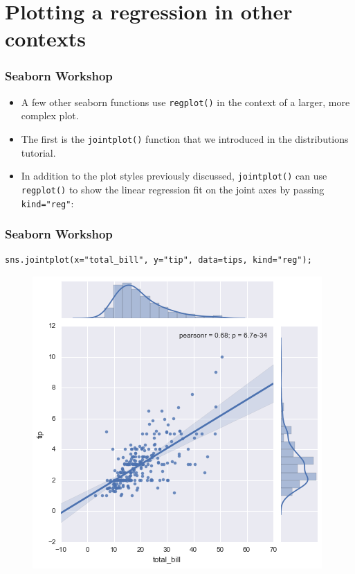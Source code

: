 \documentclass{beamer}
\begin{document}
\section{Plotting a regression in other contexts}
\begin{frame}[fragile]
\frametitle{Seaborn Workshop}
\large
	\begin{itemize}
\item A few other seaborn functions use \texttt{regplot()} in the context of a larger, more complex plot. 
\item The first is the \texttt{jointplot()} function that we introduced in the distributions tutorial.
\item In addition to the plot styles previously discussed, \texttt{jointplot()} can use \texttt{regplot()} to show the linear regression fit on the joint axes by passing \texttt{kind="reg"}:
\end{itemize}
\end{frame}
\begin{frame}[fragile]
\frametitle{Seaborn Workshop}
	\large

\begin{verbatim}
sns.jointplot(x="total_bill", y="tip", data=tips, kind="reg");
\end{verbatim}

\begin{figure}
\centering
\includegraphics[width=0.7\linewidth]{images/regression_51_0}
\end{figure}
\end{frame}
\end{document}
